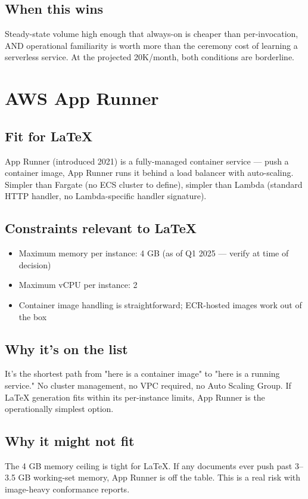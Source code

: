 \documentclass[11pt,letterpaper]{article}
\begin{document}
\subsection{When this wins}
Steady-state volume high enough that always-on is cheaper than per-invocation, AND operational familiarity is worth more than the ceremony cost of learning a serverless service. At the projected 20K/month, both conditions are borderline.

\newpage
\section{AWS App Runner}
\label{app:apprunner}

\subsection{Fit for LaTeX}
App Runner (introduced 2021) is a fully-managed container service --- push a container image, App Runner runs it behind a load balancer with auto-scaling. Simpler than Fargate (no ECS cluster to define), simpler than Lambda (standard HTTP handler, no Lambda-specific handler signature).

\subsection{Constraints relevant to LaTeX}
\begin{itemize}[nosep]
  \item Maximum memory per instance: 4 GB (as of Q1 2025 --- verify at time of decision)
  \item Maximum vCPU per instance: 2
  \item Container image handling is straightforward; ECR-hosted images work out of the box
\end{itemize}

\subsection{Why it's on the list}
It's the shortest path from "here is a container image" to "here is a running service." No cluster management, no VPC required, no Auto Scaling Group. If LaTeX generation fits within its per-instance limits, App Runner is the operationally simplest option.

\subsection{Why it might not fit}
The 4 GB memory ceiling is tight for LaTeX. If any documents ever push past 3--3.5 GB working-set memory, App Runner is off the table. This is a real risk with image-heavy conformance reports.
\end{document}
